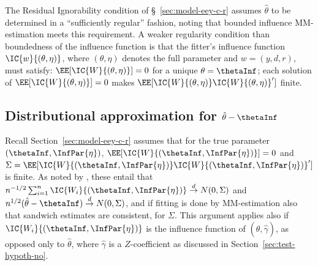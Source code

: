 The Residual Ignorability condition of \S~\ref{sec:model-eey-c-r}
assumes
$\hat\theta$ to be determined in a ``sufficiently regular'' fashion,
noting that bounded influence MM-estimation meets this requirement.  A
weaker regularity condition than boundedness of the influence function
is that the fitter's influence function
$\IC{w}{(\theta, \eta)}$, %
where $(\theta, \eta)$ denotes the full parameter and $w =
({y},d,r)$, must satisfy:
$\EE[\IC{W}{(\theta, \eta)}] =0$ for a unique $\theta = \thetaInf$;
each solution of $\EE[\IC{W}{(\theta, \eta)}] =0$ makes
$\EE[\IC{W}{(\theta, \eta)} \IC{W}{(\theta, \eta)}']$ finite.

\subsection{Distributional approximation for $\hat\theta - \thetaInf$} \label{sec:distr-appr-hatth}
\sloppy
Recall Section~\ref{sec:model-eey-c-r} %
assumes that for the true parameter $(\thetaInf, \InfPar{\eta})$,
$\EE[\IC{W}{(\thetaInf, \InfPar{\eta})}] =0$ and
$\Sigma = \EE[\IC{W}{(\thetaInf, \InfPar{\eta})} \IC{W}{(\thetaInf,
  \InfPar{\eta})}']$ is finite.  As noted by
\citet[\S~3]{stefanski2002calculus}, these entail that
$n^{-1/2} \sum_{i=1}^{n}\IC{W_{i}}{(\thetaInf, \InfPar{\eta})}
\stackrel{d}{\rightarrow} N(0,\Sigma)$ and
$n^{1/2}(\hat\theta - \thetaInf) \stackrel{d}{\rightarrow}
N(0,\Sigma)$, and if fitting is done by MM-estimation also that
sandwich estimates are consistent, for $\Sigma$.  This argument
applies also if $\IC{W_{i}}{(\thetaInf, \InfPar{\eta})}$ is the
influence function of $(\hat\theta, \hat\gamma)$, as opposed only to
$\hat\theta$, where $\hat\gamma$ is a $Z$-coefficient as discussed in
Section~\ref{sec:test-hypoth-no}.

